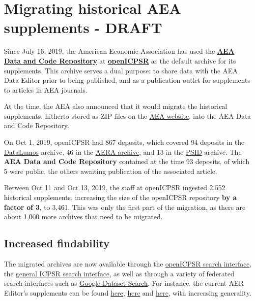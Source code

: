 \documentclass[]{article}
\title{}
\author{}
\date{}
\begin{document}
\hypertarget{migrating-historical-aea-supplements---draft}{%
\section{Migrating historical AEA supplements -
DRAFT}\label{migrating-historical-aea-supplements---draft}}

Since July 16, 2019, the American Economic Association has used the
\textbf{\href{https://www.openicpsr.org/openicpsr/aea}{AEA Data and Code
Repository}} at
\textbf{\href{https://www.openicpsr.org/openicpsr/}{openICPSR}} as the
default archive for its supplements. This archive serves a dual purpose:
to share data with the AEA Data Editor prior to being published, and as
a publication outlet for supplements to articles in AEA journals.

At the time, the AEA also announced that it would migrate the historical
supplements, hitherto stored as ZIP files on the
\href{https://www.aeaweb.org/journals}{AEA website}, into the AEA Data
and Code Repository.

On Oct 1, 2019, openICPSR had 867 deposits, which covered 94 deposits in
the \href{https://www.datalumos.org/datalumos/search/studies}{DataLumos}
archive, 46 in the
\href{https://www.openicpsr.org/openicpsr/search/aerajournals/studies}{AERA
archive}, and 13 in the
\href{https://www.openicpsr.org/openicpsr/search/psid/studies}{PSID}
archive. The \textbf{AEA Data and Code Repository} contained at the time
93 deposits, of which 5 were public, the others awaiting publication of
the associated article.

Between Oct 11 and Oct 13, 2019, the staff at openICPSR ingested 2,552
historical supplements, increasing the size of the openICPSR repository
\textbf{by a factor of 3}, to 3,461. This was only the first part of the
migration, as there are about 1,000 more archives that need to be
migrated.

\hypertarget{increased-findability}{%
\subsection{Increased findability}\label{increased-findability}}

The migrated archives are now available through the
\href{https://www.openicpsr.org/openicpsr/search/aea/studies}{openICPSR
search interface}, the
\href{https://www.icpsr.umich.edu/icpsrweb/ICPSR/search/studies}{general
ICPSR search interface}, as well as through a variety of federated
search interfaces such as
\href{https://toolbox.google.com/datasetsearch/search}{Google Dataset
Search}. For instance, the current AER Editor's supplements can be found
\href{https://www.openicpsr.org/openicpsr/search/aea/studies?start=0\&ARCHIVE=aea\&sort=score\%20desc\%2CTITLE_SORT\%20asc\&rows=25\&q=esther\%20duflo}{here},
\href{https://www.icpsr.umich.edu/icpsrweb/ICPSR/search/studies?start=0\&ARCHIVE=ICPSR\&PUBLISH_STATUS=PUBLISHED\&sort=score\%20desc\%2CTITLE_SORT\%20asc\&rows=50\&q=esther\%20duflo}{here}
and
\href{https://toolbox.google.com/datasetsearch/search?query=esther\%20duflo}{here},
with increasing generality.
\end{document}
